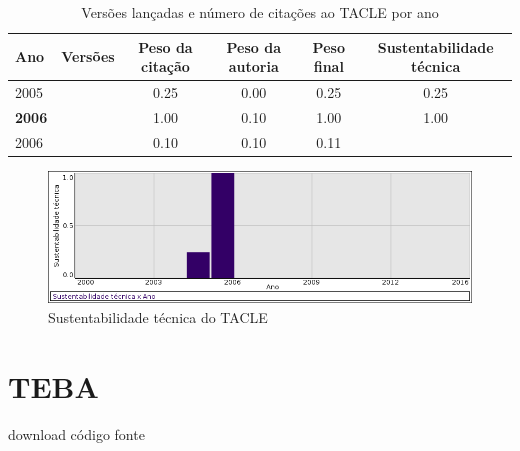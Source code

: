 \begin{table}[H]
\caption{Versões lançadas e número de citações ao TACLE por ano}
\centering
\begin{tabular}{| l | c | c | c | c | c |}
  \hline
  Ano & Versões & Peso da citação & Peso da autoria & Peso final & Sustentabilidade técnica \\
  \hline
            2005
          &
          
          &
          0.25
          &
          0.00
          &
          0.25
          &
            {\color{red} 0.25}
          \\
\hline
            {\bf 2006}
          &
          
          &
          1.00
          &
          0.10
          &
          1.00
          &
            {\color{blue} 1.00}
          \\
            2006
          &
          
          &
          0.10
          &
          0.10
          &
          0.11
          &
          \\
\hline
\end{tabular}
\end{table}

\begin{figure}[h]
  \center
  \includegraphics[scale=0.50]{imagens/softwares-charts/tacle.png}
  \caption{Sustentabilidade técnica do TACLE}
\end{figure}


\section{TEBA}
\checkmark download
\checkmark código fonte


